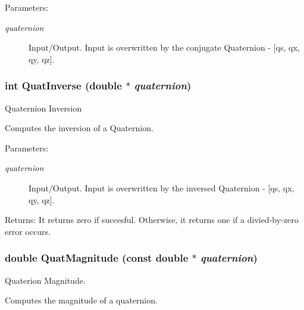 \begin{Desc}
\item[Parameters:]
\begin{description}
\item[{\em quaternion}]Input/Output. Input is overwritten by the conjugate Quaternion - \mbox{[}qs, qx, qy, qz\mbox{]}. \end{description}
\end{Desc}
\hypertarget{group__quaternion_g2f9bc45e4b1c6431b33c4ae852603254}{
\subsubsection[QuatInverse]{\setlength{\rightskip}{0pt plus 5cm}int QuatInverse (double $\ast$ {\em quaternion})}}
\label{group__quaternion_g2f9bc45e4b1c6431b33c4ae852603254}


Quaternion Inversion 

Computes the inversion of a Quaternion.

\begin{Desc}
\item[Parameters:]
\begin{description}
\item[{\em quaternion}]Input/Output. Input is overwritten by the inversed Quaternion - \mbox{[}qs, qx, qy, qz\mbox{]}.\end{description}
\end{Desc}
\begin{Desc}
\item[Returns:]It returns zero if succesful. Otherwise, it returns one if a divied-by-zero error occurs. \end{Desc}
\hypertarget{group__quaternion_g7c36b75808197e37e672aac00ee21935}{
\subsubsection[QuatMagnitude]{\setlength{\rightskip}{0pt plus 5cm}double QuatMagnitude (const double $\ast$ {\em quaternion})}}
\label{group__quaternion_g7c36b75808197e37e672aac00ee21935}


Quaterion Magnitude. 

Computes the magnitude of a quaternion.

